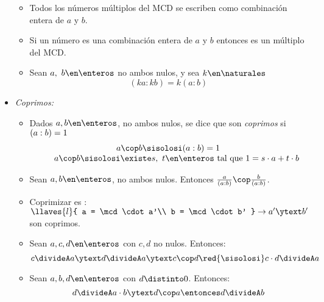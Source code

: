 \begin{itemize}
\begin{itemize}
          \item Todos los números múltiplos del MCD se escriben como combinación entera de $a$ y $b$.
          \item Si un número es una combinación entera de $a$ y $b$ entonces es un múltiplo del MCD.
          \item Sean $a,\ b \en \enteros$ no ambos nulos, y sea $k \en \naturales$
                \[
                  (ka:kb) = k(a:b)
                \]
        \end{itemize}
  \item \textit{Coprimos: }
        \begin{itemize}
          \item
                Dados $a,b \en \enteros$, no ambos nulos, se dice que son \textit{coprimos} si $(a:b) = 1$
                \[
                  \begin{array}{c}
                    a \cop b \sisolosi \mcd = 1 \\
                    \qquad a\cop b \sisolosi \existe s,\ t \en \enteros \text{ tal que } 1 = \cz
                  \end{array}
                \]
          \item
                Sean $a,b \en \enteros$, no ambos nulos. Entonces $\frac{a}{\mcd}\cop \frac{b}{\mcd}$.
          \item Coprimizar es :
                $\llaves{l}{
                    a = \mcd \cdot a'\\
                    b = \mcd \cdot b'
                  }\to a' \ytext b'$ son coprimos.

          \item Sean $a, c, d \en \enteros$ con $c,d$ no nulos. Entonces:
                \[
                  c \divideA a \ytext d \divideA a \ytext c \cop d \red{\sisolosi} c\cdot d \divideA a
                \]
          \item Sean $a, b, d \en \enteros$ con $d \distinto 0$. Entonces:
                \[
                  d \divideA a \cdot b \ytext d \cop a   \entonces d \divideA b
                \]

        \end{itemize}


\end{itemize}
